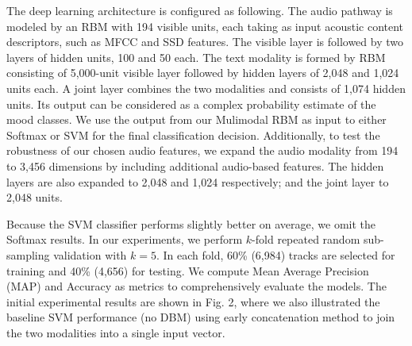\documentclass{llncs}
\begin{document}
The deep learning architecture is configured as following. The audio pathway is modeled by an  RBM with 194 visible units, each taking as input acoustic content descriptors, such as MFCC and SSD features. The visible layer is followed by two layers of hidden units, 100 and 50 each. The text modality is formed by RBM consisting of 5,000-unit visible layer followed by hidden layers of 2,048 and 1,024 units each. A joint layer combines the two modalities and consists of 1,074 hidden units. Its output can be considered as a complex probability estimate of the mood classes. We use the output from our Mulimodal RBM as input to either Softmax or SVM for the final classification decision. Additionally, to test the robustness of our chosen audio features, we expand the audio modality from 194 to 3,456 dimensions by including additional audio-based features. The hidden layers are also expanded to 2,048 and 1,024 respectively; and the joint layer to 2,048 units.



Because the SVM classifier performs slightly better on average, we omit the Softmax results. In our experiments, we perform $k$-fold repeated random sub-sampling validation with $k=5$. In each fold, 60\% (6,984) tracks are selected for training and 40\% (4,656) for testing. We compute Mean Average Precision (MAP) %
and Accuracy as metrics to comprehensively evaluate the models. %
The initial experimental results are shown in Fig. 2, %
where we also illustrated the baseline SVM performance (no DBM) using early concatenation method to join the two modalities into a single input vector.
\end{document}
